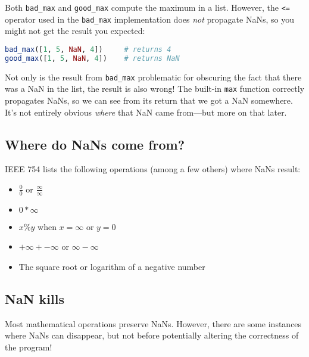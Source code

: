\documentclass{juliacon}
\begin{document}
Both \texttt{bad\_max} and \texttt{good\_max} compute the maximum in a list.
However, the \texttt{<=} operator used in the \texttt{bad\_max} implementation does \emph{not} propagate NaNs, so you might not get the result you expected:

\begin{lstlisting}[language = Julia]
bad_max([1, 5, NaN, 4])     # returns 4
good_max([1, 5, NaN, 4])    # returns NaN
\end{lstlisting}

Not only is the result from \texttt{bad\_max} problematic for obscuring the fact that there was a NaN in the list, the result is also wrong!
The built-in \texttt{max} function correctly propagates NaNs, so we can see from its return that we got a NaN somewhere.
It's not entirely obvious \emph{where} that NaN came from---but more on that later.   %

\subsection{Where do NaNs come from?}

IEEE 754 \cite{IEEEStandardBinary1985} lists the following operations (among a few others) where NaNs result:

\begin{itemize}
\item $\frac{0}{0}$ or $\frac{\infty}{\infty}$
\item $0 * \infty$
\item $x \% y$ when $x = \infty$ or $y = 0$
\item $+\infty + -\infty$ or $\infty - \infty$
\item The square root or logarithm of a negative number
\end{itemize}


\subsection{NaN kills}

Most mathematical operations preserve NaNs.
However, there are some instances where NaNs can disappear, but not before potentially altering the correctness of the program!

\end{document}
